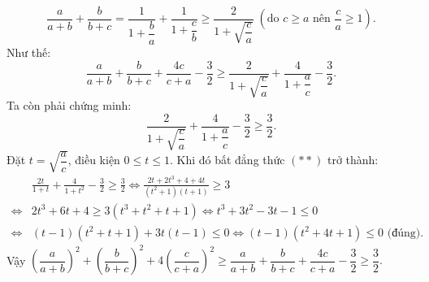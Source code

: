 \begin{ex}
{ $$\dfrac{a}{a+b}+\dfrac{b}{b+c}=\dfrac{1}{1+\dfrac{b}{a}}+\dfrac{1}{1+\dfrac{c}{b}}\ge \dfrac{2}{1+\sqrt{\dfrac{c}{a}}} \;(\text{do $c\ge a$ nên $\dfrac{c}{a}\ge 1$}).$$
Như thế:
$$\dfrac{a}{a+b}+\dfrac{b}{b+c}+\dfrac{4c}{c+a}-\dfrac{3}{2}\ge \dfrac{2}{1+\sqrt{\dfrac{c}{a}}}+\dfrac{4}{1+\dfrac{a}{c}}-\dfrac{3}{2}.$$}
Ta còn phải chứng minh:
\[\dfrac{2}{1+\sqrt{\dfrac{c}{a}}}+\dfrac{4}{1+\dfrac{a}{c}}-\dfrac{3}{2}\ge\dfrac{3}{2}.\tag{**}\]
Đặt $t=\sqrt{\dfrac{a}{c}}$, điều kiện $ 0\le t\le 1$. Khi đó bất đẳng thức $(**)$ trở thành: 
{\allowdisplaybreaks
\begin{align*}
&\frac{{2t}}{{1 + t}} + \frac{4}{{1 + {t^2}}} - \frac{3}{2} \ge \frac{3}{2} \Leftrightarrow \frac{{2t + 2{t^3} + 4 + 4t}}{{({t^2} + 1)(t + 1)}} \ge 3\\
\Leftrightarrow& 2{t^3} + 6t + 4 \ge 3\left( {{t^3} + {t^2} + t + 1} \right) \Leftrightarrow {t^3} + 3{t^2} - 3t - 1 \le 0\\
\Leftrightarrow& \left( {t - 1} \right)\left( {{t^2} + t + 1} \right) + 3t\left( {t - 1} \right) \le 0 \Leftrightarrow (t - 1)\left( {{t^2} + 4t + 1} \right) \le 0\,\, \text{(đúng)}.
\end{align*}}Vậy $\left(\dfrac{a}{a+b}\right)^2+\left(\dfrac{b}{b+c}\right)^2+4\left(\dfrac{c}{c+a}\right)^2\ge\dfrac{a}{a+b}+\dfrac{b}{b+c}+\dfrac{4c}{c+a}-\dfrac{3}{2}\ge \dfrac{3}{2}.$
\end{ex}

